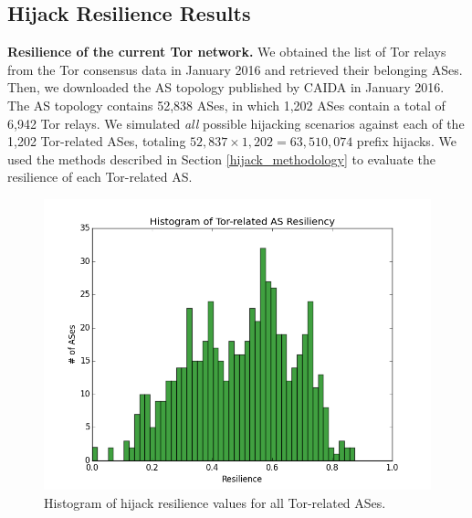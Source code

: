 
\subsection{Hijack Resilience Results}

{\bf Resilience of the current Tor network.} We obtained the list of Tor relays from the Tor consensus data in January 2016 and retrieved their belonging ASes. Then, we downloaded the AS topology published by CAIDA in January 2016. The AS topology contains 52,838 ASes, in which 1,202 ASes contain a total of 6,942 Tor relays. We simulated \emph{all} possible hijacking scenarios against each of the 1,202 Tor-related ASes, totaling $52,837 \times 1,202 = 63,510,074$ prefix hijacks. We used the methods described in Section \ref{hijack_methodology} to evaluate the resilience of each Tor-related AS. 

\begin{figure}[ht!]
\centering
\includegraphics[width=.4\textwidth]{resilience_histogram}
\caption{Histogram of hijack resilience values for all Tor-related ASes.}
\label{fig:hijack_resilience_histogram}
\end{figure}

